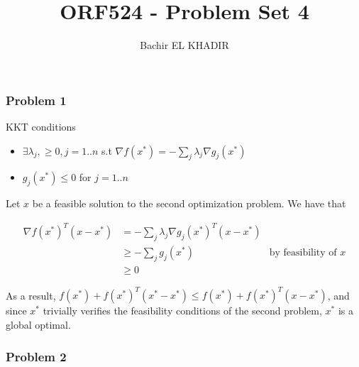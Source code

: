 \documentclass[12pt]{article}
\title{ORF524 - Problem Set 4}
\author{Bachir EL KHADIR }
\newcommand{\Q}[1]{\subsubsection*{Problem #1}}
\begin{document}
\maketitle

\Q{1}
KKT conditions

\begin{itemize}
\item $\exists \lambda_j, \ge 0,  j= 1..n$ s.t $\nabla f(x^*) = - \sum_j \lambda_j \nabla g_j(x^*)$
\item $g_j(x^*) \le 0$ for $j = 1..n$
\end{itemize}


Let $x$ be a feasible solution to the second optimization problem. We have that

\begin{align*}
\nabla f(x^*)^T(x-x^*) &= - \sum_j \lambda_j \nabla g_j(x^*)^T(x-x^*)
\\& \ge - \sum_j g_j(x^*) &\text{by feasibility of $x$}
\\& \ge 0 
\end{align*}

As a result, $f(x^*) + f(x^*)^T(x^*-x^*) \le f(x^*) + f(x^*)^T(x-x^*)$, and since $x^*$ trivially verifies the feasibility conditions of the second problem, $x^*$ is a global optimal.


\Q{2}
\end{document}
